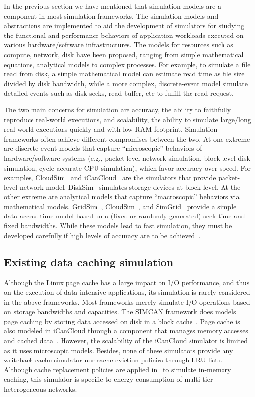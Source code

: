 In the previous section we have mentioned that simulation models are 
a component in most simulation frameworks.
The simulation models and abstractions are implemented to aid the 
development of simulators for studying the functional and performance 
behaviors of application workloads executed on various 
hardware/software infrastructures. 
The models for resources such as compute, network, disk have been proposed, 
ranging from simple mathematical equations, analytical models 
to complex processes.
For example, to simulate a file read from disk, a simple mathematical model 
can estimate read time as file size divided by disk bandwidth, while 
a more complex, discrete-event model simulate detailed events such as 
disk seeks, read buffer, etc to fulfill the read request.

The two main concerns for simulation are accuracy, the ability to 
faithfully reproduce real-world executions, and scalability, 
the ability to simulate large/long real-world executions quickly 
and with low RAM footprint. 
Simulation frameworks often achieve different compromises between the two.  
At one extreme are discrete-event models that capture
``microscopic'' behaviors of hardware/software systems (e.g.,
packet-level network simulation, block-level disk simulation,
cycle-accurate CPU simulation), which favor accuracy over speed.  
For examples, CloudSim~\cite{cloudsim} and 
iCanCloud~\cite{nunez2012icancloud} are the simulators that provide 
packet-level network model, DiskSim~\cite{bucy2003disksim} simulates 
storage devices at block-level.  
At the other extreme are analytical models that capture
``macroscopic'' behaviors via mathematical models.  
GridSim~\cite{gridsim}, CloudSim~\cite{cloudsim}, and 
SimGrid~\cite{casanova2014simgrid} provide a simple data access time 
model based on a (fixed or randomly generated) seek time and 
fixed bandwidths. 
While these models lead to fast simulation, they must be developed
carefully if high levels of accuracy are to be achieved~\cite{velhoTOMACS2013}. 

\subsection{Existing data caching simulation}

Although the Linux page cache has a large impact on I/O
performance, and thus on the execution of data-intensive
applications, its simulation is rarely considered in the above
frameworks.  Most frameworks merely simulate I/O operations
based on storage bandwidths and capacities.  The SIMCAN
framework does models page caching by storing data accessed on
disk in a block cache~\cite{nunez2012simcan}.  Page cache is
also modeled in iCanCloud through a component that manages
memory accesses and cached data~\cite{nunez2012icancloud}.
However, the scalability of the iCanCloud simulator is limited
as it uses microscopic models.  Besides, none
of these simulators provide any writeback cache simulator nor
cache eviction policies through LRU lists.  Although cache
replacement policies are applied in~\cite{xu2018saving} to
simulate in-memory caching, this simulator is specific to
energy consumption of multi-tier heterogeneous networks.

